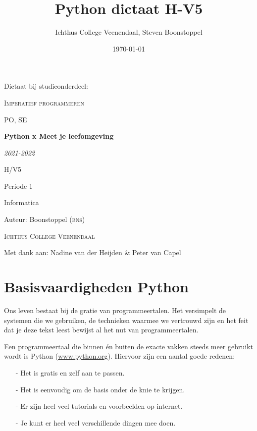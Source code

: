 \documentclass[a4paper,11pt, fleqn]{article}
\title{Python dictaat H-V5}
\author{Ichthus College Veenendaal, Steven Boonstoppel}
\date{\today}
\newcommand{\ditwc}{Naam van het huidige werkcollege}
\begin{document}
\begin{titlepage}
	{\LARGE Dictaat bij studieonderdeel:\par}
	\vspace{1cm}
	{\scshape\LARGE Imperatief programmeren\par}
	\vspace{1cm}
	{\scshape\Large PO, SE\par}
	\vspace{2cm}
	{\Huge\bfseries Python x Meet je leefomgeving\par}
	\vspace{2cm}
	{\Large\itshape 2021-2022\par}
	\vfill
	H/V5\par
	Periode 1\par
	Informatica\par
	Auteur: Boonstoppel \textsc{(bns)}\par
	\textsc{Ichthus College Veenendaal}\par
	Met dank aan: Nadine van der Heijden \& Peter van Capel
\end{titlepage}

\tableofcontents

\clearpage
\renewcommand{\ditwc}{Basisvaardigheden Python}
\section[Basisvaardigheden Python]{\ditwc}
Ons leven bestaat bij de gratie van programmeertalen. Het versimpelt de systemen die we gebruiken, de technieken waarmee we vertrouwd zijn en het feit dat je deze tekst leest bewijst al het nut van programmeertalen.
 
Een programmeertaal die binnen \'en buiten de exacte vakken steeds meer gebruikt wordt is Python (\url{www.python.org}). Hiervoor zijn een aantal goede redenen:
\begin{itemize}
\item[-] Het is gratis en zelf aan te passen.
\item[-] Het is eenvoudig om de basis onder de knie te krijgen.
\item[-] Er zijn heel veel tutorials en voorbeelden op internet.
\item[-] Je kunt er heel veel verschillende dingen mee doen.
\end{itemize}
\end{document}
